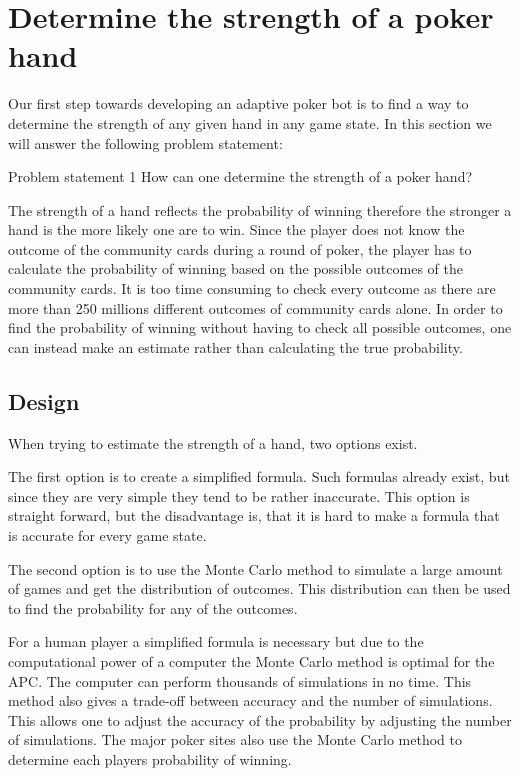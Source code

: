 \section{Determine the strength of a poker hand}
\label{sec:part1}
Our first step towards developing an adaptive poker bot is to find a way to determine the strength of any given hand in any game state. In this section we will answer the following problem statement: 

\vspace{4mm}
\begin{statementBox2}{Problem statement 1}
How can one determine the strength of a poker hand?
\end{statementBox2}
\vspace{4mm}

The strength of a hand reflects the probability of winning therefore the stronger a hand is the more likely one are to win. Since the player does not know the outcome of the community cards during a round of poker, the player has to calculate the probability of winning based on the possible outcomes of the community cards. It is too time consuming to check every outcome as there are more than 250 millions different outcomes of community cards alone. In order to find the probability of winning without having to check all possible outcomes, one can instead make an estimate rather than calculating the true probability. 

\subsection{Design}
When trying to estimate the strength of a hand, two options exist.

The first option is to create a simplified formula. Such formulas already exist, but since they are very simple they tend to be rather inaccurate. This option is straight forward, but the disadvantage is, that it is hard to make a formula that is accurate for every game state.

The second option is to use the Monte Carlo method to simulate a large amount of games and get the distribution of outcomes. This distribution can then be used to find the probability for any of the outcomes.

For a human player a simplified formula is necessary but due to the computational power of a computer the Monte Carlo method is optimal for the APC. The computer can perform thousands of simulations in no time. This method also gives a trade-off between accuracy and the number of simulations. This allows one to adjust the accuracy of the probability by adjusting the number of simulations. The major poker sites also use the Monte Carlo method to determine each players probability of winning.

